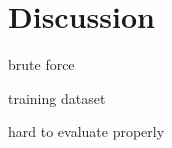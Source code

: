 \chapter{Discussion}
\label{sec:Discussion}
brute force

training dataset

hard to evaluate properly
